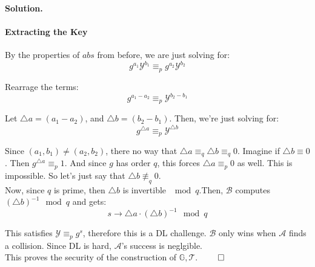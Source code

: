 \documentclass[12pt]{article}
\theoremstyle{definition}
\newcommand{\addbigskip}{\addvspace{\bigskipamount}}
\newenvironment{solution}
     {\addbigskip
      \noindent\color{blue}\textbf{Solution.\ }}
     {\par\addbigskip}
\newenvironment{solution}
     {\comment}
     {\endcomment}
\newcommand{\A}{\mathcal{A}}
\newcommand{\G}{\mathbb{G}}
\newcommand{\Y}{\mathcal{Y}}
\newcommand{\T}{\mathcal{T}}
\newcommand{\B}{\mathcal{B}}
\begin{document}
\begin{solution}
\paragraph{Extracting the Key} By the properties of $abs$ from before, we are just solving for:
\begin{equation*}
    g^{a_1}\Y^{b_1} \equiv_p g^{a_2}\Y^{b_2}
\end{equation*}

\noindent Rearrage the terms:
\begin{equation*}
    g^{a_1 - a_2} \equiv_p \Y^{b_2 - b_1}
\end{equation*}

\noindent Let $\triangle a = (a_1 - a_2)$, and $\triangle b = (b_2 - b_1)$. Then, we're just solving for:
\begin{equation*}
    g^{\triangle a} \equiv_p \Y^{\triangle b}
\end{equation*}

\noindent Since $(a_1, b_1) \neq (a_2, b_2)$, there no way that $\triangle a \equiv_q \triangle b \equiv_q 0$. Imagine if $\triangle b \equiv 0$. Then $g^{\triangle a} \equiv_p 1$. And since $g$ has order $q$, this forces $\triangle a \equiv_p 0$ as well. This is impossible. So let's just say that $\triangle b \not\equiv_q 0$.\\

\noindent Now, since $q$ is prime, then $\triangle b$ is invertible $\mod q$.Then, $\B$ computes $(\triangle b)^{-1} \mod q$ and gets:
\begin{equation*}
    s \rightarrow \triangle a \cdot (\triangle b)^{-1} \mod q
\end{equation*}

\noindent This satisfies $\Y \equiv_p g^s$, therefore this is a DL challenge. $\B$ only wins when $\A$ finds a collision. Since DL is hard, $\A$'s success is neglgible.\\

\noindent This proves the security of the construction of $\G, \T$. $\qed$
\end{solution}
\end{document}
